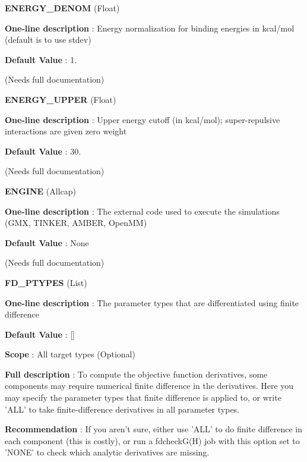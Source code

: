 \begin{DoxyItemize}
\item {\bfseries  E\-N\-E\-R\-G\-Y\-\_\-\-D\-E\-N\-O\-M } (Float) \par
{\bfseries  One-\/line description }\-: Energy normalization for binding energies in kcal/mol (default is to use stdev) \par
{\bfseries  Default Value }\-: 1. \par
(Needs full documentation)\end{DoxyItemize}
\begin{DoxyItemize}
\item {\bfseries  E\-N\-E\-R\-G\-Y\-\_\-\-U\-P\-P\-E\-R } (Float) \par
{\bfseries  One-\/line description }\-: Upper energy cutoff (in kcal/mol); super-\/repulsive interactions are given zero weight \par
{\bfseries  Default Value }\-: 30. \par
(Needs full documentation)\end{DoxyItemize}
\begin{DoxyItemize}
\item {\bfseries  E\-N\-G\-I\-N\-E } (Allcap) \par
{\bfseries  One-\/line description }\-: The external code used to execute the simulations (G\-M\-X, T\-I\-N\-K\-E\-R, A\-M\-B\-E\-R, Open\-M\-M) \par
{\bfseries  Default Value }\-: None \par
(Needs full documentation)\end{DoxyItemize}
\begin{DoxyItemize}
\item {\bfseries  F\-D\-\_\-\-P\-T\-Y\-P\-E\-S } (List) \par
{\bfseries  One-\/line description }\-: The parameter types that are differentiated using finite difference \par
{\bfseries  Default Value }\-: \mbox{[}\mbox{]} \par
{\bfseries  Scope }\-: All target types (Optional) \par
{\bfseries  Full description }\-: To compute the objective function derivatives, some components may require numerical finite difference in the derivatives. Here you may specify the parameter types that finite difference is applied to, or write 'A\-L\-L' to take finite-\/difference derivatives in all parameter types. \par
{\bfseries  Recommendation }\-: If you aren't sure, either use 'A\-L\-L' to do finite difference in each component (this is costly), or run a fdcheck\-G(\-H) job with this option set to 'N\-O\-N\-E' to check which analytic derivatives are missing.\end{DoxyItemize}

